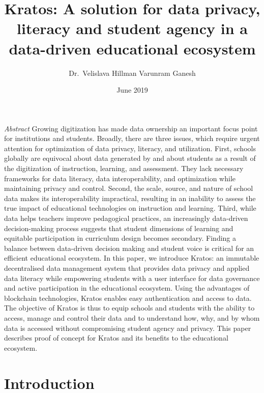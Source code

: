 \documentclass{article}
\title{Kratos: A solution for data privacy, literacy and student agency in a data-driven educational ecosystem}
\author{Dr.\ Velislava Hillman \quad Varunram Ganesh}
\date{June 2019}
\begin{document}
\maketitle

\textit{Abstract}
Growing digitization has made data ownership an important focus point for institutions and students. Broadly, there are three issues, which require urgent attention for optimization of data privacy, literacy, and utilization. First, schools globally are equivocal about data generated by and about students as a result of the digitization of instruction, learning, and assessment. They lack necessary frameworks for data literacy, data interoperability, and optimization while maintaining privacy and control. Second, the scale, source, and nature of school data makes its interoperability impractical, resulting in an inability to assess the true impact of educational technologies on instruction and learning. Third, while data helps teachers improve pedagogical practices, an increasingly data-driven decision-making process suggests that student dimensions of learning and equitable participation in curriculum design becomes secondary. Finding a balance between data-driven decision making and student voice is critical for an efficient educational ecosystem. In this paper, we introduce Kratos: an immutable decentralised data management system that provides data privacy and applied data literacy while empowering students with a user interface for data governance and active participation in the educational ecosystem. Using the advantages of blockchain technologies, Kratos enables easy authentication and access to data. The objective of Kratos is thus to equip schools and students with the ability to access, manage and control their data and to understand how, why, and by whom data is accessed without compromising student agency and privacy. This paper describes proof of concept for Kratos and its benefits to the educational ecosystem.
\bigbreak

\section{Introduction}
\end{document}

